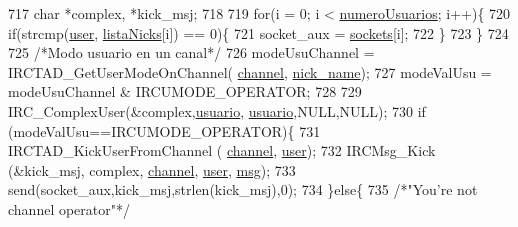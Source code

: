 \begin{DoxyCode}
{{{{{{{{{{717                                                 \textcolor{keywordtype}{char} *complex, *kick\_msj;
718 
719                                                 \textcolor{keywordflow}{for}(i = 0; i < \hyperlink{_g-2361-06-_p1-_server_8c_ac9a5ec6f534d2a8e2a870179807d32dc}{numeroUsuarios}; i++)\{
720                                                         \textcolor{keywordflow}{if}(strcmp(\hyperlink{_g-2361-06-_p1-_server_8c_a14871705f45ccdc5bb9f4549efd8e119}{user}, 
      \hyperlink{_g-2361-06-_p1-_server_8c_a713172366a6be2fbf8456a4b43702603}{listaNicks}[i]) == 0)\{
721                                                                 socket\_aux = 
      \hyperlink{_g-2361-06-_p1-_server_8c_a7724e53f22e431d1ecb6516951a172e1}{sockets}[i];
722                                                         \}
723                                                 \}
724 
725                                                 \textcolor{comment}{/*Modo usuario en un canal*/}
726                                                 modeUsuChannel = IRCTAD\_GetUserModeOnChannel(
      \hyperlink{_g-2361-06-_p1-_server_8c_a842ca2f026578e5c479c095ff3335969}{channel}, \hyperlink{_g-2361-06-_p1-_server_8c_aabbf66718cda228b924a4a9441eadf62}{nick\_name});
727                                                 modeValUsu = modeUsuChannel & IRCUMODE\_OPERATOR;
728 
729                                                 IRC\_ComplexUser(&complex,\hyperlink{_g-2361-06-_p1-_server_8c_a0147a5b81499984f9cb00379a8cb84af}{usuario},
      \hyperlink{_g-2361-06-_p1-_server_8c_a0147a5b81499984f9cb00379a8cb84af}{usuario},NULL,NULL);
730                                                 \textcolor{keywordflow}{if} (modeValUsu==IRCUMODE\_OPERATOR)\{
731                                                         IRCTAD\_KickUserFromChannel (
      \hyperlink{_g-2361-06-_p1-_server_8c_a842ca2f026578e5c479c095ff3335969}{channel}, \hyperlink{_g-2361-06-_p1-_server_8c_a14871705f45ccdc5bb9f4549efd8e119}{user});
732                                                         IRCMsg\_Kick (&kick\_msj, complex, 
      \hyperlink{_g-2361-06-_p1-_server_8c_a842ca2f026578e5c479c095ff3335969}{channel}, \hyperlink{_g-2361-06-_p1-_server_8c_a14871705f45ccdc5bb9f4549efd8e119}{user}, \hyperlink{_g-2361-06-_p1-_server_8c_a32d2f5216cddb59c7cc8fb2806a7e727}{msg});
733                                                         send(socket\_aux,kick\_msj,strlen(kick\_msj),0);
734                                                 \}\textcolor{keywordflow}{else}\{
735                                                         \textcolor{comment}{/*"You're not channel operator"*/}
}}}}}}}}}}
\end{DoxyCode}
